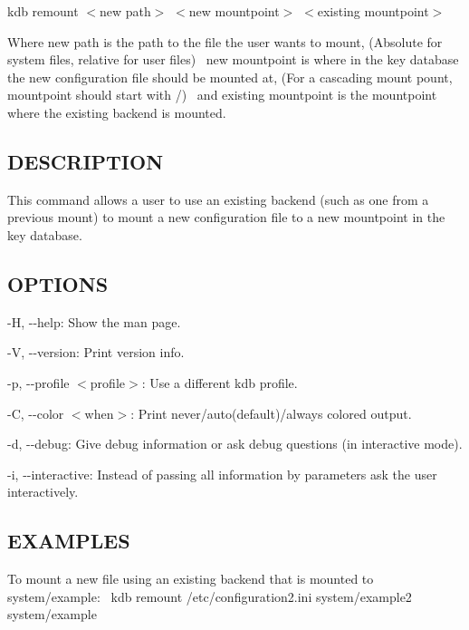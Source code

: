 {\ttfamily kdb remount $<$new path$>$ $<$new mountpoint$>$ $<$existing mountpoint$>$}

Where {\ttfamily new path} is the path to the file the user wants to mount, (Absolute for system files, relative for user files)~\newline
 {\ttfamily new mountpoint} is where in the key database the new configuration file should be mounted at, (For a cascading mount pount, {\ttfamily mountpoint} should start with {\ttfamily /})~\newline
 and {\ttfamily existing mountpoint} is the mountpoint where the existing backend is mounted.~\newline


\subsection*{D\+E\+S\+C\+R\+I\+P\+T\+I\+ON}

This command allows a user to use an existing backend (such as one from a previous mount) to mount a new configuration file to a new mountpoint in the key database.~\newline


\subsection*{O\+P\+T\+I\+O\+NS}


\begin{DoxyItemize}
\item {\ttfamily -\/H}, {\ttfamily -\/-\/help}\+: Show the man page.
\item {\ttfamily -\/V}, {\ttfamily -\/-\/version}\+: Print version info.
\item {\ttfamily -\/p}, {\ttfamily -\/-\/profile $<$profile$>$}\+: Use a different kdb profile.
\item {\ttfamily -\/C}, {\ttfamily -\/-\/color $<$when$>$}\+: Print never/auto(default)/always colored output.
\item {\ttfamily -\/d}, {\ttfamily -\/-\/debug}\+: Give debug information or ask debug questions (in interactive mode).
\item {\ttfamily -\/i}, {\ttfamily -\/-\/interactive}\+: Instead of passing all information by parameters ask the user interactively.
\end{DoxyItemize}

\subsection*{E\+X\+A\+M\+P\+L\+ES}

To mount a new file using an existing backend that is mounted to {\ttfamily system/example}\+:~\newline
 {\ttfamily kdb remount /etc/configuration2.ini system/example2 system/example}~\newline
 